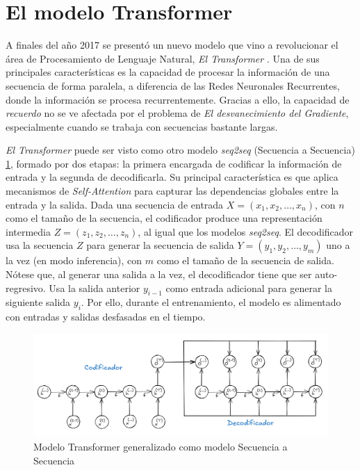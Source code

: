 \section{El modelo Transformer}

A finales del año 2017 se presentó un nuevo modelo que vino a revolucionar el área de Procesamiento
de Lenguaje Natural, \textit{El Transformer} \cite{Vaswani}. Una de sus principales características
es la capacidad de procesar la información de una secuencia de forma paralela, a diferencia de las
Redes Neuronales Recurrentes, donde la información se procesa recurrentemente. Gracias a ello, la
capacidad de \textit{recuerdo} no se ve afectada por el problema de \textit{El desvanecimiento del
Gradiente}, especialmente cuando se trabaja con secuencias bastante largas.

\textit{El Transformer} puede ser visto como otro modelo \textit{seq2seq} (Secuencia a Secuencia)
\ref{fig:trans_seq2sqe}, formado por dos etapas: la primera encargada de codificar la información de
entrada y la segunda de decodificarla. Su principal característica es que aplica mecanismos de
\textit{Self-Attention} para capturar las dependencias globales entre la entrada y la salida. Dada
una secuencia de entrada $X = (x_1, x_2, \dots, x_n)$, con $n$ como el tamaño de la secuencia, el
codificador produce una representación intermedia $Z = (z_1, z_2, \dots, z_n)$, al igual que los
modelos \textit{seq2seq}. El decodificador usa la secuencia $Z$ para generar la secuencia de salida
$Y = (y_1, y_2, \dots, y_m)$ uno a la vez (en modo inferencia), con $m$ como el tamaño de la secuencia
de salida. Nótese que, al generar una salida a la vez, el decodificador tiene que ser auto-regresivo.
Usa la salida anterior $y_{i-1}$ como entrada adicional para generar la siguiente salida $y_i$. Por
ello, durante el entrenamiento, el modelo es alimentado con entradas y salidas desfasadas en el tiempo.

\begin{figure}[ht!]
    \centering
    \includegraphics[width=0.9 \textwidth]{Chapters/2. Transformer/Figures/transformer/t_seq2seq.png}
    \caption{Modelo Transformer generalizado como modelo Secuencia a Secuencia}
    \label{fig:trans_seq2sqe}
\end{figure}


